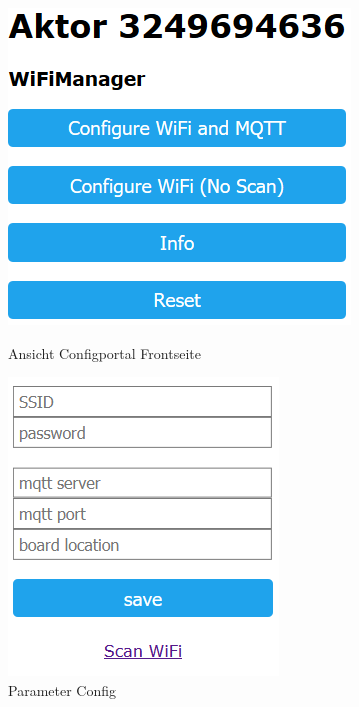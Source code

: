 \begin{figure}[H]
	\begin{center}
	\begin{minipage}[b]{.3\linewidth} %
		\includegraphics[width=\textwidth]{graphics/Configportal.PNG}
		\caption{Ansicht Configportal Frontseite}
	\end{minipage}
	\hspace{.1\linewidth}%
	\begin{minipage}[b]{.3\linewidth} %
		\includegraphics[width=\textwidth]{graphics/Configportal2.PNG}
		\caption{Parameter Config}
	\end{minipage}
\end{center}
\end{figure}
